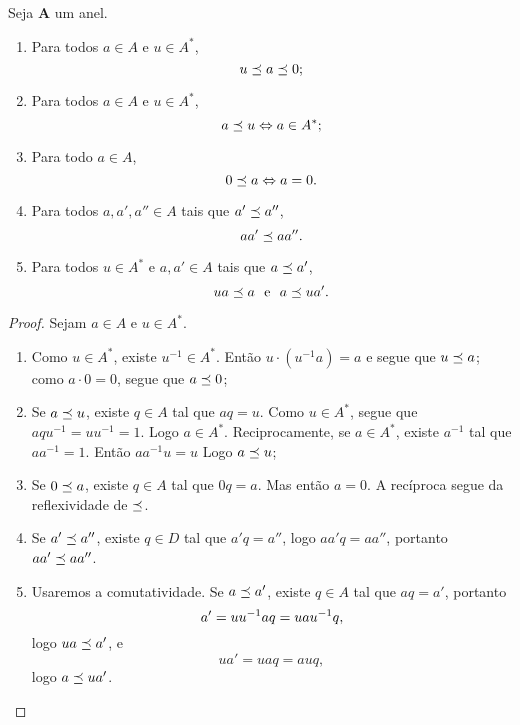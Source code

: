 \begin{proposition}
Seja $\bm A$ um anel.
	\begin{enumerate}
	\item Para todos $a \in A$ e $u \in A^*$,
		\begin{equation*}
		u \preceq a \preceq 0;
		\end{equation*}
	\item Para todos $a \in A$ e $u \in A^*$,
		\begin{equation*}
		a \preceq u \Leftrightarrow a \in A^*;
		\end{equation*}
	\item Para todo $a \in A$,
		\begin{equation*}
		0 \preceq a \Leftrightarrow a=0.
		\end{equation*}
	\item Para todos $a,a',a'' \in A$ tais que $a' \preceq a''$,
		\begin{equation*}
		aa' \preceq aa''.
		\end{equation*}
	\item Para todos $u \in A^*$ e $a,a' \in A$ tais que $a \preceq a'$,
		\begin{equation*}
		ua \preceq a \text{\ \ e\ \ } a \preceq ua'.
		\end{equation*}
	\end{enumerate}
\end{proposition}
\begin{proof} Sejam $a \in A$ e $u \in A^*$.
	\begin{enumerate}
	\item Como $u \in A^*$, existe $u^{-1} \in A^*$. Então $u\cdot(u^{-1}a) = a$ e segue que $u \preceq a$; como $a \cdot 0 = 0$, segue que $a \preceq 0$;
	\item Se $a \preceq u$, existe $q \in A$ tal que $aq=u$. Como $u \in A^*$, segue que $aqu^{-1}=uu^{-1}=1$. Logo $a \in A^*$. Reciprocamente, se $a \in A^*$, existe $a^{-1}$ tal que $aa^{-1}=1$. Então $aa^{-1}u=u$ Logo $a \preceq u$;
	\item Se $0 \preceq a$, existe $q \in A$ tal que $0q=a$. Mas então $a=0$. A recíproca segue da reflexividade de $\preceq$.
	\item Se $a' \preceq a''$, existe $q \in D$ tal que $a'q=a''$, logo $aa'q=aa''$, portanto $aa' \preceq aa''$.
	\item Usaremos a comutatividade. Se $a \preceq a'$, existe $q \in A$ tal que $aq=a'$, portanto
		\begin{equation*}
		a' = uu^{-1} aq = uau^{-1} q,
		\end{equation*}
logo $ua \preceq a'$, e
		\begin{equation*}
		ua' = uaq = auq,
		\end{equation*}
logo $a \preceq ua'$.
	 \qedhere
	\end{enumerate}
\end{proof}


